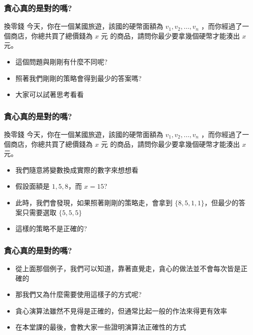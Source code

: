 \documentclass[aspectratio=169]{beamer}
\begin{document}
\begin{frame}
\frametitle{貪心真的是對的嗎?}
    \begin{block}{換零錢}
    今天，你在一個某國旅遊，該國的硬幣面額為 $v_1, v_2, \ldots, v_n$ ，而你經過了一個商店，你總共買了總價錢為 $x$ 元 的商品，請問你最少要拿幾個硬幣才能湊出 $x$ 元。
    \end{block}
    
    \begin{itemize}
    \item<1-> 這個問題與剛剛有什麼不同呢?
    \item<1-> 照著我們剛剛的策略會得到最少的答案嗎?
    \item<3-> 大家可以試著思考看看
    \end{itemize}
\end{frame}

\begin{frame}
\frametitle{貪心真的是對的嗎?}
    \begin{block}{換零錢}
    今天，你在一個某國旅遊，該國的硬幣面額為 $v_1, v_2, \ldots, v_n$ ，而你經過了一個商店，你總共買了總價錢為 $x$ 元 的商品，請問你最少要拿幾個硬幣才能湊出 $x$ 元。
    \end{block}
    
    \begin{itemize}
    \item<1-> 我們隨意將變數換成實際的數字來想想看
    \item<2-> 假設面額是 $1,5,8$，而 $x=15$?
    \item<3-> 此時，我們會發現，如果照著剛剛的策略走，會拿到 $\{8,5,1,1\}$，但最少的答案只需要選取 $\{5,5,5\}$
    \item<4-> 這樣的策略不是正確的?
    \end{itemize}
\end{frame}

\begin{frame}
\frametitle{貪心真的是對的嗎?}
    \begin{itemize}
    \item<1-> 從上面那個例子，我們可以知道，靠著直覺走，貪心的做法並不會每次皆是正確的
    \item<2-> 那我們又為什麼需要使用這樣子的方式呢?
    \item<3-> 貪心演算法雖然不見得是正確的，但通常比起一般的作法來得更有效率
    \item<4-> 在本堂課的最後，會教大家一些證明演算法正確性的方式
    \end{itemize}
\end{frame}
\end{document}
